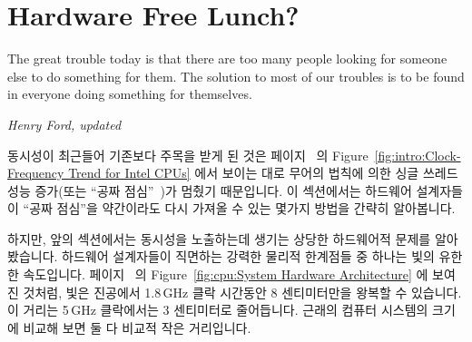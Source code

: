 
\section{Hardware Free Lunch?}
\label{sec:cpu:Hardware Free Lunch?}
%
\epigraph{The great trouble today is that there are too many people looking
	  for someone else to do something for them.
	  The solution to most of our troubles is to be found in everyone
	  doing something for themselves.}
	 {\emph{Henry Ford, updated}}

동시성이 최근들어 기존보다 주목을 받게 된 것은
페이지~\pageref{fig:intro:Clock-Frequency Trend for Intel CPUs} 의
Figure~\ref{fig:intro:Clock-Frequency Trend for Intel CPUs} 에서 보이는 대로
무어의 법칙에 의한 싱글 쓰레드 성능 증가(또는 ``공짜
점심''~\cite{HerbSutter2008EffectiveConcurrency})가 멈췄기 때문입니다.
이 섹션에서는 하드웨어 설계자들이 ``공짜 점심''을 약간이라도 다시 가져올 수
있는 몇가지 방법을 간략히 알아봅니다.
\iffalse

The major reason that concurrency has been receiving so much focus over
the past few years is the end of Moore's-Law induced single-threaded
performance increases
(or ``free lunch''~\cite{HerbSutter2008EffectiveConcurrency}),
as shown in
Figure~\ref{fig:intro:Clock-Frequency Trend for Intel CPUs} on
page~\pageref{fig:intro:Clock-Frequency Trend for Intel CPUs}.
This section briefly surveys a few ways that hardware designers
might be able to bring back some form of the ``free lunch''.
\fi

하지만, 앞의 섹션에서는 동시성을 노출하는데 생기는 상당한 하드웨어적 문제를
알아봤습니다.
하드웨어 설계자들이 직면하는 강력한 물리적 한계점들 중 하나는 빛의 유한한
속도입니다.
페이지~\pageref{fig:cpu:System Hardware Architecture} 의
Figure~\ref{fig:cpu:System Hardware Architecture} 에 보여진 것처럼, 빛은
진공에서 1.8\,GHz 클락 시간동안 8 센티미터만을 왕복할 수 있습니다.
이 거리는 5\,GHz 클락에서는 3 센티미터로 줄어듭니다.
근래의 컴퓨터 시스템의 크기에 비교해 보면 둘 다 비교적 작은 거리입니다.
\iffalse

However, the preceding section presented some substantial hardware
obstacles to exploiting concurrency.
One severe physical limitation that hardware designers face is the
finite speed of light.
As noted in
Figure~\ref{fig:cpu:System Hardware Architecture} on
page~\pageref{fig:cpu:System Hardware Architecture},
light can travel only about an 8-centimeters round trip
in a vacuum during the duration of a 1.8\,GHz clock period.
This distance drops to about 3~centimeters for a 5\,GHz clock.
Both of these distances are relatively small compared to the size
of a modern computer system.
\fi

